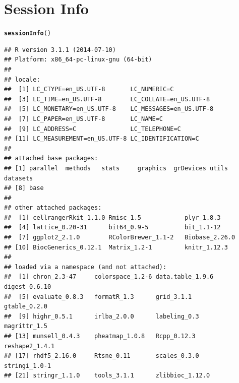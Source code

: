 \documentclass[10pt,oneside]{article}\usepackage[]{graphicx}\usepackage[]{color}
\makeatletter
\newcommand{\hlstd}[1]{\textcolor[rgb]{0.345,0.345,0.345}{#1}}%
\newcommand{\hlkwd}[1]{\textcolor[rgb]{0.737,0.353,0.396}{\textbf{#1}}}%
\newenvironment{kframe}{%
 \def\at@end@of@kframe{}%
 \ifinner\ifhmode%
  \def\at@end@of@kframe{\end{minipage}}%
  \begin{minipage}{\columnwidth}%
 \fi\fi%
 \def\FrameCommand##1{\hskip\@totalleftmargin \hskip-\fboxsep
 \colorbox{shadecolor}{##1}\hskip-\fboxsep
     \hskip-\linewidth \hskip-\@totalleftmargin \hskip\columnwidth}%
 \MakeFramed {\advance\hsize-\width
   \@totalleftmargin\z@ \linewidth\hsize
   \@setminipage}}%
 {\par\unskip\endMakeFramed%
 \at@end@of@kframe}
\newenvironment{knitrout}{}{} %
\makeatother
\begin{document}
\section{Session Info}
\begin{knitrout}
\color{fgcolor}\begin{kframe}
\begin{alltt}
\hlkwd{sessionInfo}\hlstd{()}
\end{alltt}
\begin{verbatim}
## R version 3.1.1 (2014-07-10)
## Platform: x86_64-pc-linux-gnu (64-bit)
## 
## locale:
##  [1] LC_CTYPE=en_US.UTF-8       LC_NUMERIC=C              
##  [3] LC_TIME=en_US.UTF-8        LC_COLLATE=en_US.UTF-8    
##  [5] LC_MONETARY=en_US.UTF-8    LC_MESSAGES=en_US.UTF-8   
##  [7] LC_PAPER=en_US.UTF-8       LC_NAME=C                 
##  [9] LC_ADDRESS=C               LC_TELEPHONE=C            
## [11] LC_MEASUREMENT=en_US.UTF-8 LC_IDENTIFICATION=C       
## 
## attached base packages:
## [1] parallel  methods   stats     graphics  grDevices utils     datasets 
## [8] base     
## 
## other attached packages:
##  [1] cellrangerRkit_1.1.0 Rmisc_1.5            plyr_1.8.3          
##  [4] lattice_0.20-31      bit64_0.9-5          bit_1.1-12          
##  [7] ggplot2_2.1.0        RColorBrewer_1.1-2   Biobase_2.26.0      
## [10] BiocGenerics_0.12.1  Matrix_1.2-1         knitr_1.12.3        
## 
## loaded via a namespace (and not attached):
##  [1] chron_2.3-47     colorspace_1.2-6 data.table_1.9.6 digest_0.6.10   
##  [5] evaluate_0.8.3   formatR_1.3      grid_3.1.1       gtable_0.2.0    
##  [9] highr_0.5.1      irlba_2.0.0      labeling_0.3     magrittr_1.5    
## [13] munsell_0.4.3    pheatmap_1.0.8   Rcpp_0.12.3      reshape2_1.4.1  
## [17] rhdf5_2.16.0     Rtsne_0.11       scales_0.3.0     stringi_1.0-1   
## [21] stringr_1.1.0    tools_3.1.1      zlibbioc_1.12.0
\end{verbatim}
\end{kframe}
\end{knitrout}



\end{document}
